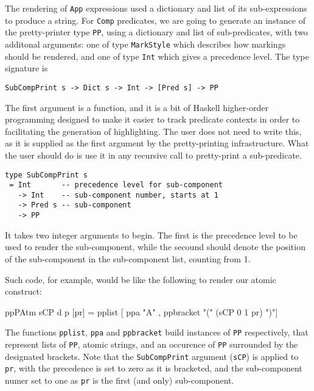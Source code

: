 The rendering of \texttt{App} expressions used a dictionary and list of its
sub-expressions to produce a string.
For \texttt{Comp} predicates, we are going to generate an instance
of the pretty-printer type \texttt{PP}, using a dictionary
and list of sub-predicates,
with two additonal arguments:
one of type \texttt{MarkStyle} which describes how markings should be rendered,
and one of type \texttt{Int} which gives a precedence level.
The type signature is
\begin{verbatim}
SubCompPrint s -> Dict s -> Int -> [Pred s] -> PP
\end{verbatim}
The first argument is a function,
and it is a bit of Haskell higher-order programming designed
to make it easier to track predicate contexts in order
to facilitating the generation of highlighting.
The user does not need to write this,
as it is supplied as the first argument by the pretty-printing
infrastructure.
What the user should do is use it in any recursive call
to pretty-print a sub-predicate.
\begin{verbatim}
type SubCompPrint s
 = Int       -- precedence level for sub-component
   -> Int    -- sub-component number, starts at 1
   -> Pred s -- sub-component
   -> PP
\end{verbatim}
It takes two integer arguments to begin.
The first is the precedence level to be used to render the
sub-component,
while the secound should denote the position of the sub-component
in the sub-component list, counting from 1.

Such code, for example, would be like the following
to render our atomic construct:
\begin{code}
ppPAtm sCP d p [pr]
 = pplist [ ppa "A"
          , ppbracket "(" (sCP 0 1 pr) ")"]
\end{code}
The functions \texttt{pplist}, \texttt{ppa} and \texttt{ppbracket}
build instances of \texttt{PP} respectively,
that represent lists of \texttt{PP},
atomic strings,
and an occurence of \texttt{PP} surrounded by the designated brackets.
Note that the \texttt{SubCompPrint} argument (\texttt{sCP})
is applied to \texttt{pr},
with the precedence is set to zero as it is bracketed,
and the sub-component numer set to one as \texttt{pr} is the first
(and only) sub-component.




